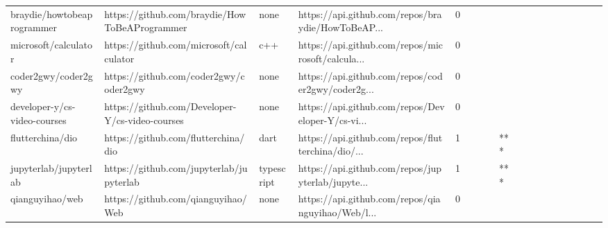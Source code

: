 \begin{tabular}{llllrlllllllllllll}
braydie/howtobeaprogrammer                         &      https://github.com/braydie/HowToBeAProgrammer &              none &  https://api.github.com/repos/braydie/HowToBeAP... &       0 &         &        &           &                &                 &        &           &           &          &          &       &              &          \\
microsoft/calculator                               &            https://github.com/microsoft/calculator &               c++ &  https://api.github.com/repos/microsoft/calcula... &       0 &         &        &           &                &                 &        &           &           &          &          &       &              &          \\
coder2gwy/coder2gwy                                &             https://github.com/coder2gwy/coder2gwy &              none &  https://api.github.com/repos/coder2gwy/coder2g... &       0 &         &        &           &                &                 &        &           &           &          &          &       &              &          \\
developer-y/cs-video-courses                       &    https://github.com/Developer-Y/cs-video-courses &              none &  https://api.github.com/repos/Developer-Y/cs-vi... &       0 &         &        &           &                &                 &        &           &           &          &          &       &              &          \\
flutterchina/dio                                   &                https://github.com/flutterchina/dio &              dart &  https://api.github.com/repos/flutterchina/dio/... &       1 &         &        &           &            *** &                 &        &           &           &          &          &       &              &          \\
jupyterlab/jupyterlab                              &           https://github.com/jupyterlab/jupyterlab &        typescript &  https://api.github.com/repos/jupyterlab/jupyte... &       1 &         &        &           &            *** &                 &        &           &           &          &          &       &              &          \\
qianguyihao/web                                    &                 https://github.com/qianguyihao/Web &              none &  https://api.github.com/repos/qianguyihao/Web/l... &       0 &         &        &           &                &                 &        &           &           &          &          &       &              &          \\

\end{tabular}
